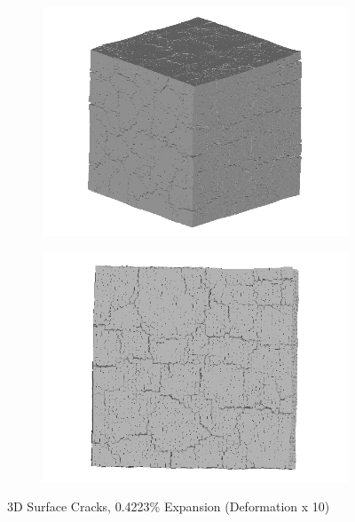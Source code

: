   \begin{figure}[ht]
  \centering
      \begin{subfigure}{.5\textwidth}
        \centering
        \includegraphics[width=.8\linewidth]{Files/exp_3D/ASR/A30P75_3_3d.png}
      \end{subfigure}%
      \begin{subfigure}{.5\textwidth}
        \centering
        \includegraphics[width=.8\linewidth]{Files/exp_3D/ASR/A30P75_3_3ds.png}
        \end{subfigure}
    \caption{3D Surface Cracks, 0.4223\% Expansion (Deformation x 10)}
    \label{fig:ASR_A30P75_3_3D_1}
  \end{figure}


